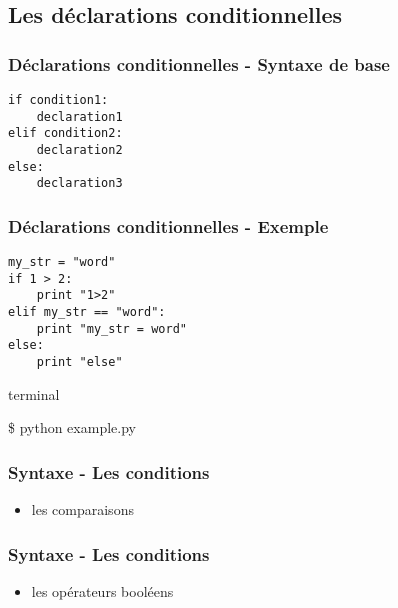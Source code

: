 \subsection{Les déclarations conditionnelles}
\begin{frame}[fragile]
  \frametitle{Déclarations conditionnelles - Syntaxe de base}
  \begin{lstlisting}
if condition1:
    declaration1
elif condition2:
    declaration2
else:
    declaration3
  \end{lstlisting}
\end{frame}

\begin{frame}[fragile]
  \frametitle{Déclarations conditionnelles - Exemple}
  \begin{lstlisting}
my_str = "word"
if 1 > 2:
    print "1>2"
elif my_str == "word":
    print "my_str = word"
else:
    print "else"
  \end{lstlisting}

  \begin{beamercolorbox}{terminal}
  \begin{semiverbatim}
 \$ python example.py
  \end{semiverbatim}
  \end{beamercolorbox}

\end{frame}

\begin{frame}[fragile]
  \frametitle{Syntaxe - Les conditions}
  \begin{itemize}
    \item les comparaisons
  \end{itemize}
  \begin{ipython}
  \end{ipython}
\end{frame}

\begin{frame}[fragile]
  \frametitle{Syntaxe - Les conditions}
  \begin{itemize}
    \item les opérateurs booléens
  \end{itemize}
  \begin{ipython}
  \end{ipython}
\end{frame}

